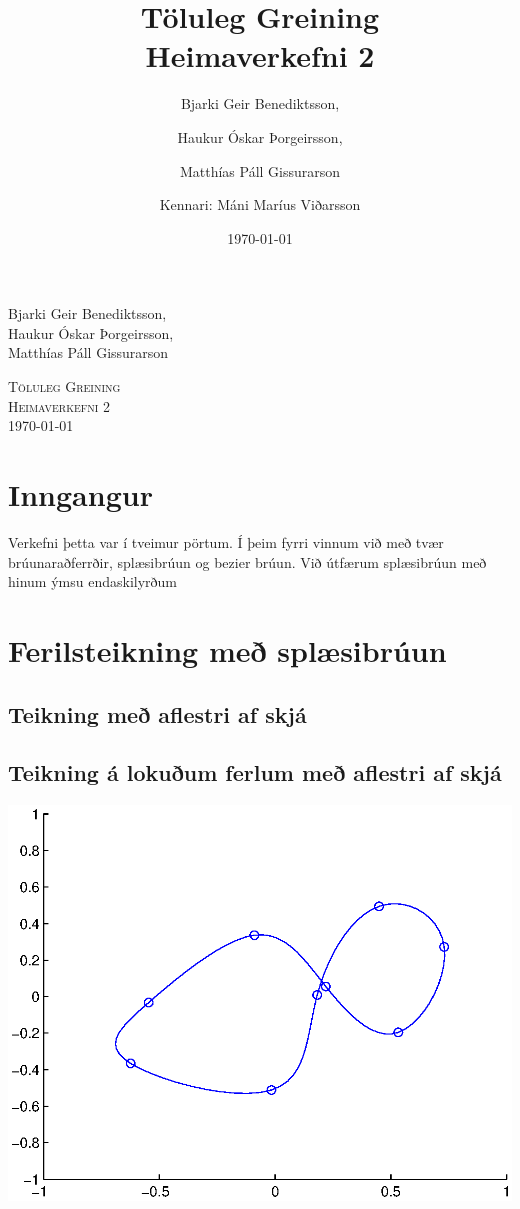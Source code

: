 \documentclass[a4]{article}
\title{Töluleg Greining\\ Heimaverkefni 2}
\date{\today{}}
\author{ 
  Bjarki Geir Benediktsson,\and
  Haukur Óskar Þorgeirsson,\and
  Matthías Páll Gissurarson \and
  Kennari: Máni Maríus Viðarsson
  }
\begin{document}
\begin{flushright}
  Bjarki Geir Benediktsson,\\
  Haukur Óskar Þorgeirsson,\\
  Matthías Páll Gissurarson\\
\end{flushright}

\begin{center}
 \textsc{ \LARGE Töluleg Greining\\
  Heimaverkefni 2\\
  \today{}
  }
  \end{center}
\vfill

\maketitle
\section*{Inngangur}
Verkefni þetta var í tveimur pörtum. Í þeim fyrri vinnum við með tvær brúunaraðferrðir, splæsibrúun og bezier brúun. Við útfærum splæsibrúun með hinum ýmsu endaskilyrðum
\section{Ferilsteikning með splæsibrúun}
\subsection{Teikning með aflestri af skjá}

\subsection{Teikning á lokuðum ferlum með aflestri af skjá}
\includegraphics[height=0.495\textheight]{Ss1.eps}\\
\end{document}
